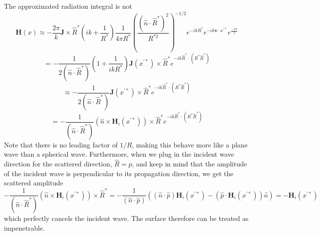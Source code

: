 \documentclass{article}
\theoremstyle{plain}
\begin{document}
The approximated radiation integral is not 
\begin{equation}
	\mathbf{H}(x) \approx
	-\frac{2\pi}{k}
	\mathbf{J} \times \hat{R}^*
	\left( ik + \frac{1}{R^*} \right)
	\frac{1}{4\pi R^*}
	\left( \frac{\left(\hat{n}\cdot\hat{R}^*\right)^2}{R^{*2}} \right)^{-1/2}
	e^{-ikR^*}
	e^{-ik\mathbf{v}\cdot x^{'*}}
	e^{\frac{-i\pi}{2}}
\end{equation}
\begin{equation}
	=
	-\frac{1}{2\left(\hat{n}\cdot\hat{R}^*\right)}
	\left( 1 + \frac{1}{ikR^*} \right)
	\mathbf{J}(x^{'*}) \times \hat{R}^*
	e^{-ik\hat{R}^*\cdot (R^*\hat{R}^*)}
\end{equation}
\begin{equation}
	\approx
	-\frac{1}{2\left(\hat{n}\cdot\hat{R}^*\right)}
	\mathbf{J}(x^{'*}) \times \hat{R}^*
	e^{-ik\hat{R}^*\cdot (R^*\hat{R}^*)}
\end{equation}
\begin{equation}
	=
	-\frac{1}{\left(\hat{n}\cdot\hat{R}^*\right)}
	\left( \hat{n} \times \mathbf{H}_i(x^{'*}) \right) \times \hat{R}^*
	e^{-ik\hat{R}^*\cdot (R^*\hat{R}^*)}
\end{equation}
Note that there is no leading factor of $1/R$,
making this behave more like a plane wave than a spherical wave.
Furthermore, when we plug in the incident wave direction for the scattered direction, 
$\hat{R}=\hat{p}$, 
and keep in mind that the amplitude of the incident wave is perpendicular to its propagation direction,
we get the scattered amplitude
\begin{equation}
	-\frac{1}{\left(\hat{n}\cdot\hat{R}^*\right)}
	\left( \hat{n} \times \mathbf{H}_i(x^{'*}) \right) \times \hat{R}^*
	=
	-\frac{1}{\left(\hat{n}\cdot\hat{p}\right)}
	\left( \left(\hat{n}\cdot\hat{p}\right)\mathbf{H}_i(x^{'*}) - \left( \hat{p}\cdot\mathbf{H}_i(x^{'*}) \right)\hat{n} \right)
	= -\mathbf{H}_i(x^{'*})
\end{equation}
which perfectly cancels the incident wave.
The surface therefore can be treated as impenetrable.
\end{document}
